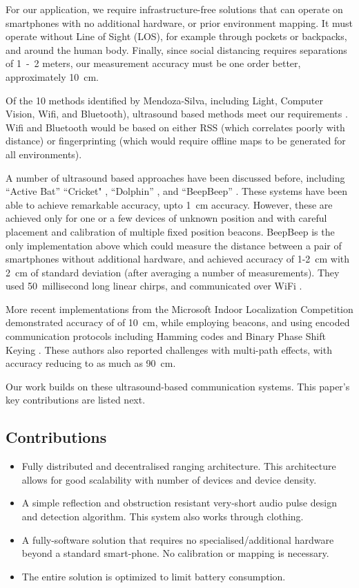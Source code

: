 \documentclass{article}
\begin{document}
For our application, we require infrastructure-free solutions that can operate on smartphones with no additional hardware, or prior environment mapping. It must operate without Line of Sight (LOS), for example through pockets or backpacks, and around the human body. Finally, since social distancing requires separations of 1~-~2 meters, our measurement accuracy must be one order better, approximately 10~cm. 

Of the 10 methods identified by Mendoza-Silva, including Light, Computer Vision, Wifi, and Bluetooth), ultrasound based methods meet our requirements \cite{MendozaSilva2019}. Wifi and Bluetooth would be based on either RSS (which correlates poorly with distance) or fingerprinting (which would require offline maps to be generated for all environments).

A number of ultrasound based approaches have been discussed before, including ``Active Bat'' \cite{Ward1997} ``Cricket" \cite{Cricket}, ``Dolphin'' \cite{Fukuju}, and ``BeepBeep'' \cite{Peng2007}. These systems have been able to achieve remarkable accuracy, upto 1~cm accuracy. However, these are achieved  only for one or a few devices of unknown position and with careful placement and calibration of multiple fixed position beacons. BeepBeep is the only implementation above which could measure the distance between a pair of smartphones without additional hardware, and achieved accuracy of 1-2~cm with 2~cm of standard deviation (after averaging a number of measurements). They used 50~millisecond long linear chirps, and communicated over WiFi \cite{Peng2007}. 

More recent implementations from the Microsoft Indoor Localization Competition demonstrated accuracy of of 10~cm, while employing beacons, and using encoded communication protocols including Hamming codes and Binary Phase Shift Keying \cite{Urena2018}. These authors also reported challenges with multi-path effects, with accuracy reducing to as much as 90~cm.

Our work builds on these ultrasound-based communication systems. This paper's key contributions are listed next.

\subsection{Contributions}
\label{sec:contributions}

\begin{itemize}
    \item Fully distributed and decentralised ranging architecture. This architecture allows for good scalability with number of devices and device density.
    \item A simple reflection and obstruction resistant very-short audio pulse design and detection algorithm. This system also works through clothing. 
    \item A fully-software solution that requires no specialised/additional hardware beyond a standard smart-phone. No calibration or mapping is necessary.
    \item The entire solution is optimized to limit battery consumption.
\end{itemize}
\end{document}
